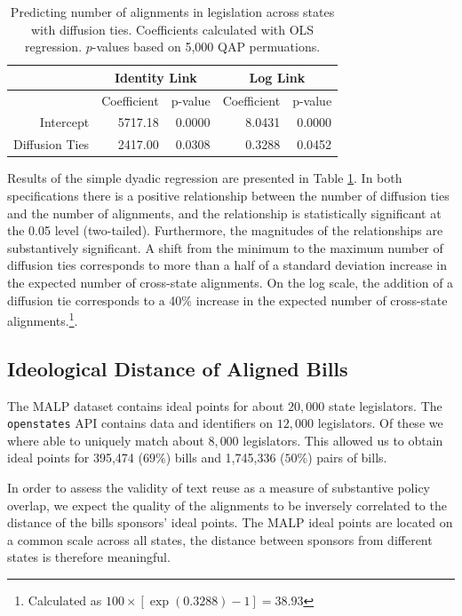 \documentclass[12pt]{article} %
\begin{document}
\begin{table}[ht]
\centering
\begin{tabular}{rrrrr}
\hline
& \multicolumn{2}{c}{Identity Link} & \multicolumn{2}{c}{Log Link} \\
  \hline
 & Coefficient & p-value & Coefficient & p-value \\ 
  \hline
Intercept & 5717.18 & 0.0000 & 8.0431 & 0.0000 \\ 
  Diffusion Ties & 2417.00 & 0.0308 & 0.3288 & 0.0452 \\ 
   \hline
\end{tabular}
\caption{Predicting number of alignments in legislation across states with diffusion ties. Coefficients calculated with OLS regression. $p$-values based on 5,000 QAP permuations.}
\label{tab:qap.diffusion}
\end{table}

Results of the simple dyadic regression are presented in Table \ref{tab:qap.diffusion}. In both specifications there is a positive relationship between the number of diffusion ties and the number of alignments, and the relationship is statistically significant at the 0.05 level (two-tailed). Furthermore, the magnitudes of the relationships are substantively significant. A shift from the minimum to the maximum number of diffusion ties corresponds to more than a half of a standard deviation increase in the expected number of cross-state alignments. On the log scale, the addition of a diffusion tie corresponds to a 40\% increase in the expected number of cross-state alignments.\footnote{Calculated as $100\times \left[ \exp(0.3288)-1\right] = 38.93$}. 



\subsection{Ideological Distance of Aligned Bills}

The MALP dataset contains ideal points for about $20,000$ state legislators. The \texttt{openstates} API contains data and identifiers on $12,000$ legislators. Of these we where able to uniquely match about $8,000$ legislators. This allowed us to obtain ideal points for 395,474 ($69\%$) bills and 1,745,336 ($50\%$) pairs of bills. 

In order to assess the validity of text reuse as a measure of substantive policy overlap, we expect the quality of the alignments to be inversely correlated to the distance of the bills sponsors' ideal points. The MALP ideal points are located on a common scale across all states, the distance between sponsors from different states is therefore meaningful. 
\end{document}
